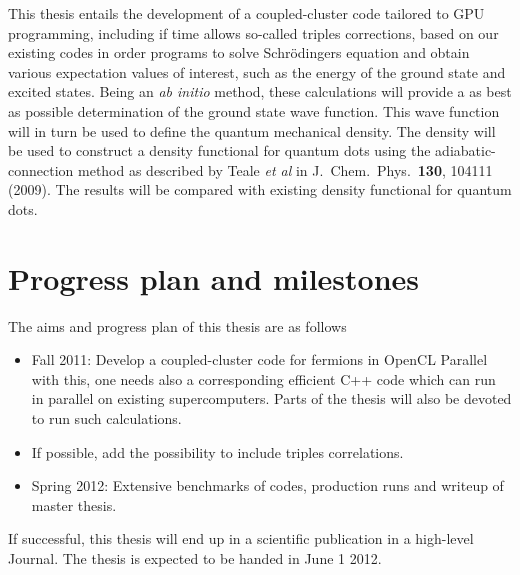 This thesis 
entails the development of a coupled-cluster code tailored to GPU programming, including if time allows so-called triples corrections, based on our existing codes in order
programs to solve Schr\"odingers equation
and obtain various expectation values of interest, such as the energy
of the ground state and excited states. 
Being an {\em ab initio} method, these calculations will provide a as best as possible determination of the 
ground state wave function. This wave function will in turn be used to define the quantum
mechanical density.  The density will be used to construct a density functional for quantum dots
using the adiabatic-connection method as described by Teale {\em et al} in J.~Chem.~Phys.~{\bf 130},
104111 (2009).  The results will be compared with existing density functional for quantum dots.


\section*{Progress plan and milestones}
The aims and progress plan of this thesis are as follows
\begin{itemize}
\item Fall 2011: Develop a coupled-cluster code for fermions in OpenCL
Parallel with this, one needs also a corresponding efficient 
C++ code which can run
in parallel on existing supercomputers.  Parts of the thesis will also be devoted to run such calculations.
\item If possible, add the possibility to include triples correlations.
\item Spring 2012: Extensive benchmarks of codes, production runs 
and writeup of master
thesis.

\end{itemize}
 
If successful, this thesis will end up in a scientific publication in a high-level Journal.
The thesis is expected to be handed in June 1 2012.





 










